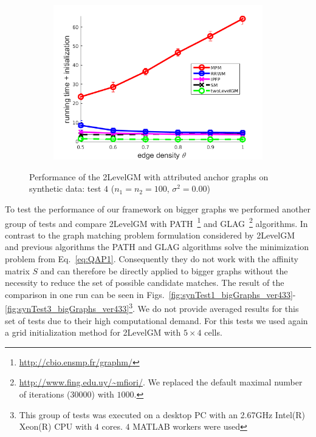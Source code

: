 \begin{figure}[h]
\begin{subfigure}[b]{0.33\textwidth}
			\includegraphics[scale=0.25]{"chapter3/fig/SyntheticTest/descr/Results_v4.3.3/Test4/time_summary_avg10t"} 
		\end{subfigure} 	
	\caption[Performance of the 2LevelGM with attributed anchor graphs on synthetic data (test $4$)]{Performance of the 2LevelGM with attributed anchor graphs on synthetic data: test $4$ ($n_1=n_2=100$, $\sigma^2=0.00$)}
	\label{fig:synTest4_descr_ver433}
\end{figure}

To test the performance of our framework on bigger graphs we performed another group of tests and compare 2LevelGM with PATH~\cite{Zazlavskiy2008_PATH}\footnote{\url{http://cbio.ensmp.fr/graphm/}} and GLAG~\cite{Fiori2013_GLAG}\footnote{\url{http://www.fing.edu.uy/~mfiori/}. We replaced the default maximal number of iterations ($30000$) with $1000$.} algorithms. In contrast to the graph matching problem formulation considered by 2LevelGM and previous algorithms the PATH and GLAG algorithms solve the minimization problem from Eq.~\eqref{eq:QAP1}. Consequently they do not work with the affinity matrix $S$ and can therefore be directly applied to bigger graphs without the necessity to reduce the set of possible candidate matches. The result of the comparison in one run can be seen in Figs.~\ref{fig:synTest1_bigGraphs_ver433}-\ref{fig:synTest3_bigGraphs_ver433}\footnote{This group of tests was executed on a desktop PC with an 2.67GHz Intel(R) Xeon(R) CPU with $4$ cores. $4$ MATLAB workers were used}. We do not provide averaged results for this set of tests due to their high computational demand. For this tests we used again a grid initialization method for 2LevelGM with $5\times 4$ cells.
\FloatBarrier

